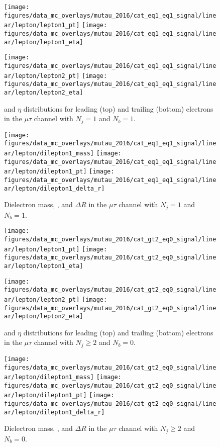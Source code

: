 \begin{figure}[htb!]
    \centering
    \texttt{[image: figures/data\_mc\_overlays/mutau\_2016/cat\_eq1\_eq1\_signal/linear/lepton/lepton1\_pt]}
    \texttt{[image: figures/data\_mc\_overlays/mutau\_2016/cat\_eq1\_eq1\_signal/linear/lepton/lepton1\_eta]}

    \texttt{[image: figures/data\_mc\_overlays/mutau\_2016/cat\_eq1\_eq1\_signal/linear/lepton/lepton2\_pt]}
    \texttt{[image: figures/data\_mc\_overlays/mutau\_2016/cat\_eq1\_eq1\_signal/linear/lepton/lepton2\_eta]}
    \caption{\pt and $\eta$ distributions for leading (top) and trailing
        (bottom) electrons in the $\mu\tau$ channel with $N_{j} = 1$ and
        $N_{b} = 1$.}
    \label{fig:mutau_3_kinematic}
\end{figure}

\begin{figure}[htb!]
    \centering
    \texttt{[image: figures/data\_mc\_overlays/mutau\_2016/cat\_eq1\_eq1\_signal/linear/lepton/dilepton1\_mass]}
    \texttt{[image: figures/data\_mc\_overlays/mutau\_2016/cat\_eq1\_eq1\_signal/linear/lepton/dilepton1\_pt]}
    \texttt{[image: figures/data\_mc\_overlays/mutau\_2016/cat\_eq1\_eq1\_signal/linear/lepton/dilepton1\_delta\_r]}
    \caption{Dielectron mass, \pt, and $\Delta R$ in the $\mu\tau$ channel
    with $N_{j} = 1$ and $N_{b} = 1$.}
    \label{fig:mutau_3_dilepton}
\end{figure}

\begin{figure}[htb!]
    \centering
    \texttt{[image: figures/data\_mc\_overlays/mutau\_2016/cat\_gt2\_eq0\_signal/linear/lepton/lepton1\_pt]}
    \texttt{[image: figures/data\_mc\_overlays/mutau\_2016/cat\_gt2\_eq0\_signal/linear/lepton/lepton1\_eta]}

    \texttt{[image: figures/data\_mc\_overlays/mutau\_2016/cat\_gt2\_eq0\_signal/linear/lepton/lepton2\_pt]}
    \texttt{[image: figures/data\_mc\_overlays/mutau\_2016/cat\_gt2\_eq0\_signal/linear/lepton/lepton2\_eta]}
    \caption{\pt and $\eta$ distributions for leading (top) and trailing
        (bottom) electrons in the $\mu\tau$ channel with $N_{j} \geq 2$ and
        $N_{b} = 0$.}
    \label{fig:mutau_4_kinematic}
\end{figure}

\begin{figure}[htb!]
    \centering
    \texttt{[image: figures/data\_mc\_overlays/mutau\_2016/cat\_gt2\_eq0\_signal/linear/lepton/dilepton1\_mass]}
    \texttt{[image: figures/data\_mc\_overlays/mutau\_2016/cat\_gt2\_eq0\_signal/linear/lepton/dilepton1\_pt]}
    \texttt{[image: figures/data\_mc\_overlays/mutau\_2016/cat\_gt2\_eq0\_signal/linear/lepton/dilepton1\_delta\_r]}
    \caption{Dielectron mass, \pt, and $\Delta R$ in the $\mu\tau$ channel
    with $N_{j} \geq 2$ and $N_{b} = 0$.}
    \label{fig:mutau_4_dilepton}
\end{figure}

